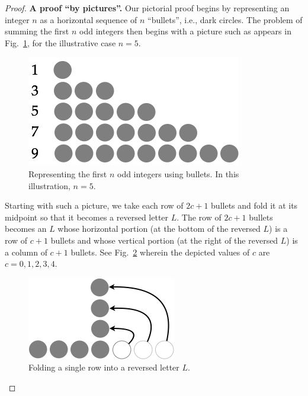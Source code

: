 \begin{proof}
{\bf A proof ``by pictures''.}
%
Our pictorial proof begins by representing an integer $n$ as a
horizontal sequence of $n$ ``bullets'', i.e., dark circles.  The
problem of summing the first $n$ odd integers then begins with a
picture such as appears in Fig.~\ref{fig:sumOdds1}, for the
illustrative case $n=5$.
\begin{figure}[h]
\begin{center}
       \includegraphics[scale=0.4]{FiguresMaths/SumOddsBasis}
\caption{Representing the first $n$ odd integers using bullets.  In
  this illustration, $n=5$.}
       \label{fig:sumOdds1}
\end{center}
\end{figure}

Starting with such a picture, we take each row of $2c+1$ bullets and
fold it at its midpoint so that it becomes a reversed letter $L$.  The
row of $2c+1$ bullets becomes an $L$ whose horizontal portion (at the
bottom of the reversed $L$) is a row of $c+1$ bullets and whose
vertical portion (at the right of the reversed $L$) is a column of
$c+1$ bullets.  See Fig.~\ref{fig:sumOdds2} wherein the depicted
values of $c$ are $c = 0, 1, 2, 3, 4$.
\begin{figure}[h]
\begin{center}
       \includegraphics[scale=0.4]{FiguresMaths/SumOddsIntermediate}
              \caption{Folding a single row into a reversed letter $L$.}
       \label{fig:sumOdds2}
\end{center}
\end{figure}


\end{proof}
